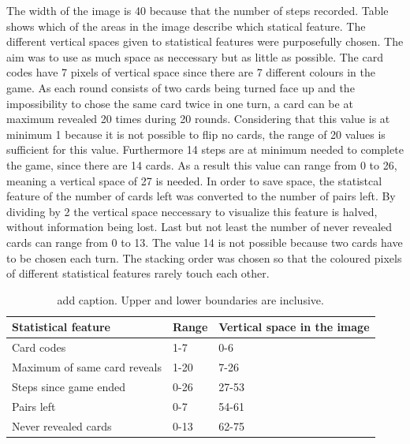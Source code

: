 The width of the image is 40 because that the number of steps recorded. Table  shows which of the areas in the image describe which statical feature. The different vertical spaces given to statistical features were purposefully chosen. The aim was to use as much space as neccessary but as little as possible. The card codes have 7 pixels of vertical space since there are 7 different colours in the game. As each round consists of two cards being turned face up and the impossibility to chose the same card twice in one turn, a card can be at maximum revealed 20 times during 20 rounds. Considering that this value is at minimum 1 because it is not possible to flip no cards, the range of 20 values is sufficient for this value. Furthermore 14 steps are at minimum needed to complete the game, since there are 14 cards. As a result this value can range from 0 to 26, meaning a vertical space of 27 is needed. In order to save space, the statistcal feature of the number of cards left was converted to the number of pairs left. By dividing by 2 the vertical space neccessary to visualize this feature is halved, without information being lost. Last but not least the number of never revealed cards can range from 0 to 13. The value 14 is not possible because two cards have to be chosen each turn. The stacking order was chosen so that the coloured pixels of different statistical features rarely touch each other. 
\begin{table}[H]
	\centering
	\caption{add caption. Upper and lower boundaries are inclusive.}%
	\begin{tabular}{|l|l|l|}
		\hline
		Statistical feature & Range & Vertical space in the image \\
		\hline
		Card codes & 1-7 & 0-6 \\
		Maximum of same card reveals & 1-20 & 7-26 \\
		Steps since game ended & 0-26 & 27-53 \\
		Pairs left & 0-7 & 54-61\\
		Never revealed cards & 0-13 & 62-75 \\
		\hline
	\end{tabular}
\end{table}

